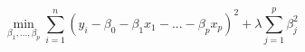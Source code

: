 $$\min_{\beta_1,...,\beta_p}\sum_{i=1}^n(y_i-\beta_0-\beta_1x_1-...-\beta_px_p)^2+\lambda \sum_{j=1}^p\beta_j^2$$